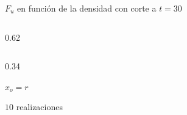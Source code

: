 \begin{frame}{$F_u$ en función de la densidad con corte a $t = 30$}
  \begin{cols}
    \begin{column}{0.62\textwidth}
    \end{column}
    \begin{column}{0.34\textwidth}
      \begin{parametros}
        \item $x_o = r$
        \item $10$ realizaciones
      \end{parametros}
    \end{column}
  \end{cols}
\end{frame}
